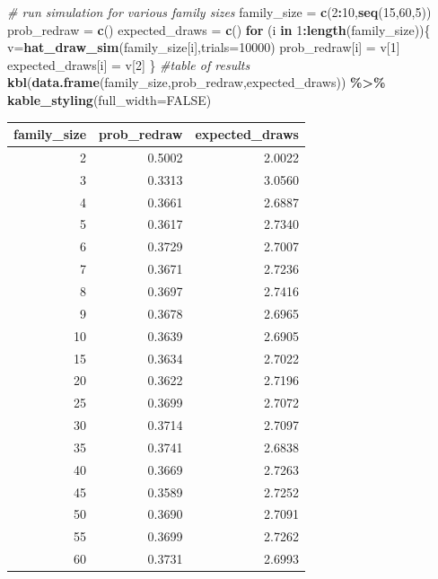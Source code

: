 \documentclass[
]{book}
\newenvironment{Shaded}{\begin{snugshade}}{\end{snugshade}}
\newcommand{\AttributeTok}[1]{\textcolor[rgb]{0.13,0.29,0.53}{#1}}
\newcommand{\CommentTok}[1]{\textcolor[rgb]{0.56,0.35,0.01}{\textit{#1}}}
\newcommand{\ConstantTok}[1]{\textcolor[rgb]{0.56,0.35,0.01}{#1}}
\newcommand{\ControlFlowTok}[1]{\textcolor[rgb]{0.13,0.29,0.53}{\textbf{#1}}}
\newcommand{\DecValTok}[1]{\textcolor[rgb]{0.00,0.00,0.81}{#1}}
\newcommand{\FunctionTok}[1]{\textcolor[rgb]{0.13,0.29,0.53}{\textbf{#1}}}
\newcommand{\NormalTok}[1]{#1}
\newcommand{\OtherTok}[1]{\textcolor[rgb]{0.56,0.35,0.01}{#1}}
\newcommand{\SpecialCharTok}[1]{\textcolor[rgb]{0.81,0.36,0.00}{\textbf{#1}}}
\theoremstyle{definition}
\theoremstyle{definition}
\theoremstyle{definition}
\theoremstyle{definition}
\theoremstyle{remark}
\begin{document}
\begin{Shaded}
\begin{Highlighting}[]
\CommentTok{\# run simulation for various family sizes}
\NormalTok{family\_size }\OtherTok{=} \FunctionTok{c}\NormalTok{(}\DecValTok{2}\SpecialCharTok{:}\DecValTok{10}\NormalTok{,}\FunctionTok{seq}\NormalTok{(}\DecValTok{15}\NormalTok{,}\DecValTok{60}\NormalTok{,}\DecValTok{5}\NormalTok{))}
\NormalTok{prob\_redraw }\OtherTok{=} \FunctionTok{c}\NormalTok{()}
\NormalTok{expected\_draws }\OtherTok{=} \FunctionTok{c}\NormalTok{()}
\ControlFlowTok{for}\NormalTok{ (i }\ControlFlowTok{in} \DecValTok{1}\SpecialCharTok{:}\FunctionTok{length}\NormalTok{(family\_size))\{}
\NormalTok{  v}\OtherTok{=}\FunctionTok{hat\_draw\_sim}\NormalTok{(family\_size[i],}\AttributeTok{trials=}\DecValTok{10000}\NormalTok{)}
\NormalTok{  prob\_redraw[i] }\OtherTok{=}\NormalTok{ v[}\DecValTok{1}\NormalTok{]}
\NormalTok{  expected\_draws[i] }\OtherTok{=}\NormalTok{ v[}\DecValTok{2}\NormalTok{]}
\NormalTok{\}}
\CommentTok{\#table of results}
\FunctionTok{kbl}\NormalTok{(}\FunctionTok{data.frame}\NormalTok{(family\_size,prob\_redraw,expected\_draws)) }\SpecialCharTok{\%\textgreater{}\%} \FunctionTok{kable\_styling}\NormalTok{(}\AttributeTok{full\_width=}\ConstantTok{FALSE}\NormalTok{)}
\end{Highlighting}
\end{Shaded}

\begin{table}
\centering
\begin{tabular}[t]{r|r|r}
\hline
family\_size & prob\_redraw & expected\_draws\\
\hline
2 & 0.5002 & 2.0022\\
\hline
3 & 0.3313 & 3.0560\\
\hline
4 & 0.3661 & 2.6887\\
\hline
5 & 0.3617 & 2.7340\\
\hline
6 & 0.3729 & 2.7007\\
\hline
7 & 0.3671 & 2.7236\\
\hline
8 & 0.3697 & 2.7416\\
\hline
9 & 0.3678 & 2.6965\\
\hline
10 & 0.3639 & 2.6905\\
\hline
15 & 0.3634 & 2.7022\\
\hline
20 & 0.3622 & 2.7196\\
\hline
25 & 0.3699 & 2.7072\\
\hline
30 & 0.3714 & 2.7097\\
\hline
35 & 0.3741 & 2.6838\\
\hline
40 & 0.3669 & 2.7263\\
\hline
45 & 0.3589 & 2.7252\\
\hline
50 & 0.3690 & 2.7091\\
\hline
55 & 0.3699 & 2.7262\\
\hline
60 & 0.3731 & 2.6993\\
\hline
\end{tabular}
\end{table}
\end{document}
